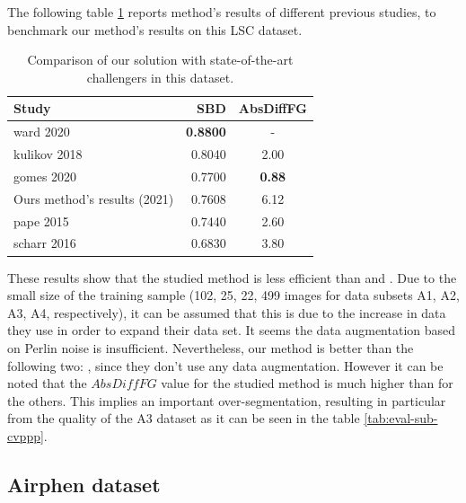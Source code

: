 \documentclass[../thesis.tex]{subfiles}
\begin{document}
    \newpage
    The following table \ref{tab:lsc-detectron} reports method's results of different previous studies, to benchmark our method's results on this LSC dataset.
    
    \begin{table}[H]
        \centering
        \begin{tabularx}{\linewidth}{|X|r|c|}
            \hline
            \textbf{Study}                              & \textbf{SBD}    & \textbf{AbsDiffFG} \\ \hline
            \cite{ward2020scalable}     ward 2020       & \textbf{0.8800} &   -  \\
            \cite{kulikov2018instance}  kulikov 2018    & 0.8040 & 2.00 \\
            \cite{gomes2020leaf}        gomes 2020      & 0.7700 & \textbf{0.88} \\
            Ours method's results (2021)                & 0.7608 & 6.12 \\
            \cite{978-3-319-16220-1_5}  pape 2015       & 0.7440 & 2.60 \\
            \cite{scharr2016leaf}       scharr 2016     & 0.6830 & 3.80 \\
            \hline
        \end{tabularx}
        \caption{Comparison of our solution with state-of-the-art challengers in this dataset.}
        \label{tab:lsc-detectron}
    \end{table}
    
    These results show that the studied method is less efficient than \cite{ward2020scalable, kulikov2018instance} and \cite{gomes2020leaf}. Due to the small size of the training sample (102, 25, 22, 499 images for data subsets A1, A2, A3, A4, respectively), it can be assumed that this is due to the increase in data they use in order to expand their data set. It seems the data augmentation based on Perlin noise is insufficient. Nevertheless, our method is better than the following two: \cite{978-3-319-16220-1_5, scharr2016leaf}, since they don't use any data augmentation.
    However it can be noted that the $AbsDiffFG$ value for the studied method is much higher than for the others. This implies an important over-segmentation, resulting in particular from the quality of the A3 dataset as it can be seen in the table \ref{tab:eval-sub-cvppp}. 
    
    \subsection{Airphen dataset}
    
\end{document}
